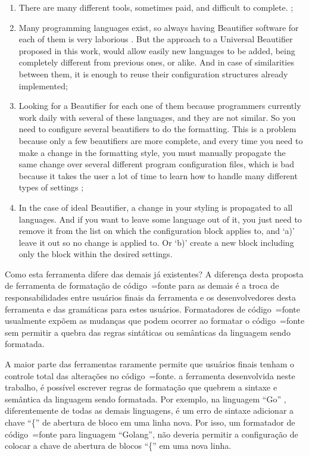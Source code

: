 {\begin{enumerate}[leftmargin=*]
    \item
        There are many different tools, sometimes paid, and difficult to
        complete. \cite{universalCodeFormatter};
    \item
        Many programming languages exist, so always having Beautifier
        software for each of them is very laborious
        \cite{universalCodeFormatter}. But the approach to a Universal
        Beautifier proposed in this work, would allow easily new languages to be
        added, being completely different from previous ones, or alike. And in
        case of similarities between them, it is enough to reuse their
        configuration structures already implemented;
    \item
        Looking for a Beautifier for each one of them because programmers
        currently work daily with several of these languages, and they are not
        similar. So you need to configure several beautifiers to do the
        formatting. This is a problem because only a few beautifiers are more
        complete, and every time you need to make a change in the formatting
        style, you must manually propagate the same change over several
        different program configuration files, which is bad because it takes the
        user a lot of time to learn how to handle many different types of
        settings \cite{universalIndentGUI};
    \item
        In the case of ideal Beautifier, a change in your styling is
        propagated to all languages. And if you want to leave some language out
        of it, you just need to remove it from the list on which the
        configuration block applies to, and `a)' leave it out so no change is
        applied to. Or `b)' create a new block including only the block within
        the desired settings.
\end{enumerate}
}{%
    Como esta ferramenta difere das demais já existentes?
    A diferença desta proposta de ferramenta de formatação de código~=fonte para as demais é a troca de responsabilidades entre usuários finais da ferramenta e
    os desenvolvedores desta ferramenta e
    das gramáticas para estes usuários.
    Formatadores de código~=fonte usualmente expõem as mudanças que podem ocorrer ao formatar o código~=fonte sem permitir a quebra das regras sintáticas ou
    semânticas da linguagem sendo formatada.

    A maior parte das ferramentas raramente permite que usuários finais tenham o controle total das alterações no código~=fonte.
     a ferramenta desenvolvida neste trabalho,
    é possível escrever regras de formatação que quebrem a sintaxe e
    semântica da linguagem sendo formatada.
    Por exemplo,
    na linguagem ``Go'' \cite{programmingLanguageGolang},
    diferentemente de todas as demais linguagens,
    é um erro de sintaxe adicionar a chave ``\{'' de abertura de bloco em uma linha nova.
    Por isso,
    um formatador de código~=fonte para linguagem ``Golang'',
    não deveria permitir a configuração de colocar a chave de abertura de blocos ``\{'' em uma nova linha.

}
